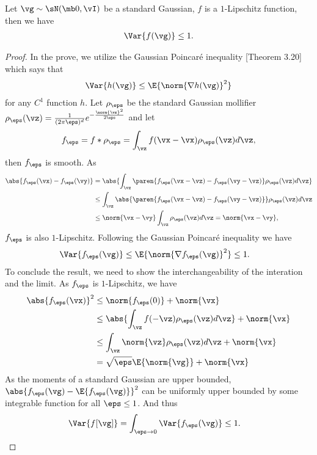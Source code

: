 \begin{lemma}\label{lem:app:lipschitz_bounded_variance}
    Let $\vg \sim \sN(\mb 0, \vI)$ be a standard Gaussian, $f$ is a $1$-Lipschitz function, then we have
    \begin{align}
        \Var{f(\vg)} \le 1.  
    \end{align}
\end{lemma}
\begin{proof}
    In the prove, we utilize the Gaussian Poincar\'e inequality \cite{boucheron2003concentration}[Theorem 3.20] which says that
\begin{align}
    \Var{h(\vg)} \le \E{\norm{\nabla h(\vg)}^2}
\end{align}
for any $C^1$ function $h$. Let $\rho_{\eps}$ be the standard Gaussian mollifier \(\rho_{\eps}(\vz) = \frac{1}{(2\pi\eps)^d}e^{-\frac{\norm{\vz}^2}{2\eps}}\)
and let \[f_{\eps} = f \ast \rho_{\eps} = \int_{\vz} f(\vx - \vx)\rho_{\eps}(\vz) d\vz,\]then $f_{\eps}$ is smooth. As
\begin{align}
    \abs{f_{\eps}(\vx) - f_{\eps}(\vy)} &= \abs{\int_{\vz} \paren{f_{\eps}(\vx - \vz) - f_{\eps}(\vy - \vz)}\rho_{\eps}(\vz)d\vz} \\
    &\le \int_{\vz} \abs{\paren{f_{\eps}(\vx - \vz) - f_{\eps}(\vy - \vz)}}\rho_{\eps}(\vz)d\vz\\
    &\le \norm{\vx - \vy} \int_{\vz}\rho_{\eps}(\vz)d\vz = \norm{\vx - \vy},
\end{align}
$f_{\eps}$ is also $1$-Lipschitz. 
Following the  Gaussian Poincar\'e inequality we have
\begin{align}
    \Var{f_{\eps}(\vg)} &\le \E{\norm{\nabla f_{\eps}(\vg)}^2} \le 1.
\end{align}
To conclude the result, we need to show the interchangeability of the interation and the limit. As $f_{\eps}$ is $1$-Lipschitz, we have 
\begin{align}
    \abs{f_{\eps}(\vx)}^2 &\le \norm{f_{\eps}(0)} + \norm{\vx} \\
    &\le \abs{\int_{\vz} f(-\vz) \rho_{\eps}(\vz)d\vz} + \norm{\vx}\\
    &\le \int_{\vz} \norm{\vz}\rho_{\eps}(\vz)d\vz + \norm{\vx} \\
    &= \sqrt{\eps} \E{\norm{\vg}} + \norm{\vx}
\end{align}
As the moments of a standard Gaussian are upper bounded, $\abs{f_{\eps}(\vg) - \E{f_{\eps}(\vg)}}^2$ can be uniformly upper bounded by some integrable function for all $\eps \le 1$. And thus
\begin{align}
    \Var{f[\vg]} &= \int_{\eps \to 0} \Var{f_{\eps}(\vg)} \le 1. 
\end{align}
\end{proof}

